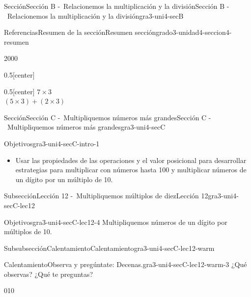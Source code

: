 \documentclass[twoside,10pt,]{article}
\begin{document}
\begin{sectionptx}{Sección}{Sección B -~Relacionemos la multiplicación y la división}{}{Sección B -~Relacionemos la multiplicación y la división}{}{}{gra3-uni4-secB}
\begin{references-subsection}{Referencias}{Resumen de la sección}{}{Resumen sección}{}{}{grado3-unidad4-seccion4-resumen}
\begin{sidebyside}{2}{0}{0}{0}
\begin{sbspanel}{0.5}[center]
\end{sbspanel}%
\begin{sbspanel}{0.5}[center]%
\(7\times 3\)\\
 \((5\times3)+(2\times3)\)%
\end{sbspanel}%
\end{sidebyside}%
\end{references-subsection}
\end{sectionptx}
%
%
\typeout{************************************************}
\typeout{************************************************}
%
\begin{sectionptx}{Sección}{Sección C -~Multipliquemos números más grandes}{}{Sección C -~Multipliquemos números más grandes}{}{}{gra3-uni4-secC}
\begin{introduction}{}%
\begin{objectives}{Objetivos}{gra3-uni4-secC-intro-1}
%
\begin{itemize}[label=\textbullet]
\item{}Usar las propiedades de las operaciones y el valor posicional para desarrollar estrategias para multiplicar con números hasta 100 y multiplicar números de un dígito por un múltiplo de 10.%
\end{itemize}
\end{objectives}
\end{introduction}%
%
%
\typeout{************************************************}
\typeout{************************************************}
%
\begin{subsectionptx}{Subsección}{Lección 12 -~Multipliquemos múltiplos de diez}{}{Lección 12}{}{}{gra3-uni4-secC-lec12}
\begin{objectives}{Objetivos}{gra3-uni4-secC-lec12-4}
Multipliquemos números de un dígito por múltiplos de 10.%
\end{objectives}
%
%
\typeout{************************************************}
\typeout{************************************************}
%
\begin{subsubsectionptx}{Subsubsección}{Calentamiento}{}{Calentamiento}{}{}{gra3-uni4-secC-lec12-warm}
\begin{exploration}{Calentamiento}{Observa y pregúntate: Decenas.}{gra3-uni4-secC-lec12-warm-3}%
¿Qué observas? ¿Qué te preguntas?%
\begin{image}{0}{1}{0}{}%

\end{image}
\end{exploration}
\end{subsubsectionptx}
\end{subsectionptx}
\end{sectionptx}
\end{document}
